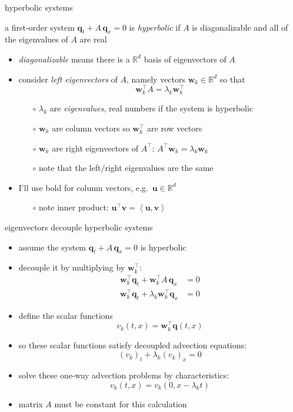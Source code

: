 \documentclass[10pt,hyperref,dvipsnames]{beamer}
\newcommand{\bq}{\mathbf{q}}
\newcommand{\bv}{\mathbf{v}}
\newcommand{\bu}{\mathbf{u}}
\newcommand{\bw}{\mathbf{w}}
\newcommand{\RR}{\mathbb{R}}
\newcommand{\ip}[2]{\left<#1,#2\right>}
\begin{document}
\begin{frame}{hyperbolic systems}

\begin{definition} a first-order system $\bq_t + A\, \bq_x=0$ is \emph{hyperbolic} if $A$ is diagonalizable and all of the eigenvalues of $A$ are real
\end{definition}

\begin{itemize}
\item \emph{diagonalizable} means there is a $\RR^d$ basis of eigenvectors of $A$
\item consider \emph{left eigenvectors} of $A$, namely vectors $\bw_k \in \RR^d$ so that
    $$\bw_k^\top A = \lambda_k \bw_k^\top$$

\vspace{-2mm}
    \begin{itemize}
    \item[$\circ$] $\lambda_k$ are \emph{eigenvalues}, real numbers if the system is hyperbolic
    \item[$\circ$] $\bw_k$ are column vectors so $\bw_k^\top$ are row vectors
    \item[$\circ$] $\bw_k$ are right eigenvectors of $A^\top$: \qquad $A^\top \bw_k = \lambda_k \bw_k$
    \item[$\circ$] note that the left/right eigenvalues are the same
    \end{itemize}

\item I'll use bold for column vectors, e.g.~$\bu\in\RR^d$
    \begin{itemize}
    \item[$\circ$] note inner product: \quad $\bu^\top \bv = \ip{\bu}{\bv}$
    \end{itemize}
\end{itemize}
\end{frame}


\begin{frame}{eigenvectors decouple hyperbolic systems}

\begin{itemize}
\item assume the system $\bq_t + A\, \bq_x=0$ is hyperbolic
\item decouple it by multiplying by $\bw_k^\top$:
\begin{align*}
\bw_k^\top \bq_t + \bw_k^\top A\, \bq_x &= 0 \\
\bw_k^\top \bq_t + \lambda_k \bw_k^\top \bq_x &= 0
\end{align*}
\item define the scalar functions
    $$v_k(t,x) = \bw_k^\top \bq(t,x)$$
\item so these scalar functions satisfy decoupled advection equations:
   $$(v_k)_t + \lambda_k (v_k)_x = 0$$
\item solve these one-way advection problems by characteristics:
   $$v_k(t,x) = v_k(0,x-\lambda_k t)$$
\item matrix $A$ must be constant for this calculation
\end{itemize}
\end{frame}
\end{document}
